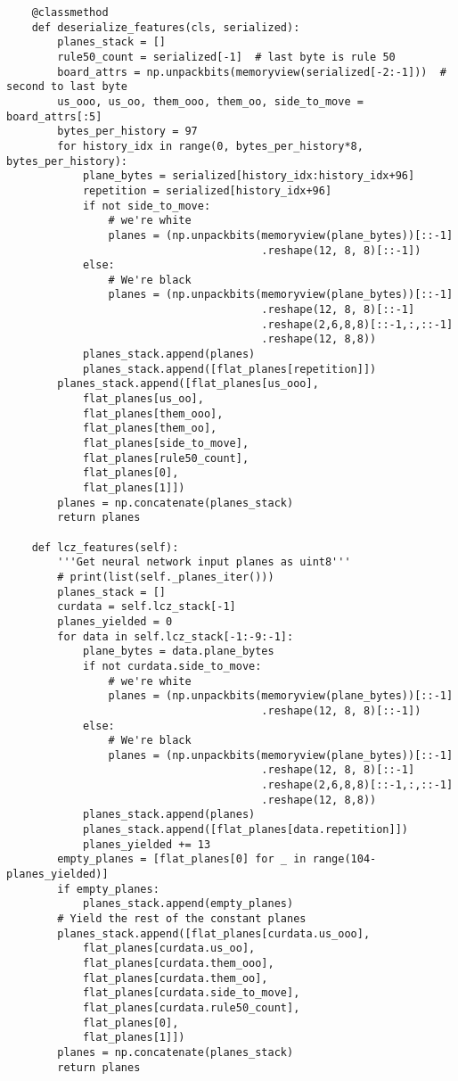 \begin{verbatim}
    @classmethod
    def deserialize_features(cls, serialized):
        planes_stack = []
        rule50_count = serialized[-1]  # last byte is rule 50
        board_attrs = np.unpackbits(memoryview(serialized[-2:-1]))  # second to last byte
        us_ooo, us_oo, them_ooo, them_oo, side_to_move = board_attrs[:5]
        bytes_per_history = 97
        for history_idx in range(0, bytes_per_history*8, bytes_per_history):
            plane_bytes = serialized[history_idx:history_idx+96]
            repetition = serialized[history_idx+96]
            if not side_to_move:
                # we're white
                planes = (np.unpackbits(memoryview(plane_bytes))[::-1]
                                        .reshape(12, 8, 8)[::-1])                
            else:
                # We're black
                planes = (np.unpackbits(memoryview(plane_bytes))[::-1]
                                        .reshape(12, 8, 8)[::-1]
                                        .reshape(2,6,8,8)[::-1,:,::-1]
                                        .reshape(12, 8,8))
            planes_stack.append(planes)
            planes_stack.append([flat_planes[repetition]])
        planes_stack.append([flat_planes[us_ooo],
            flat_planes[us_oo],
            flat_planes[them_ooo],
            flat_planes[them_oo],
            flat_planes[side_to_move],
            flat_planes[rule50_count],
            flat_planes[0],
            flat_planes[1]])     
        planes = np.concatenate(planes_stack)
        return planes                
        
    def lcz_features(self):
        '''Get neural network input planes as uint8'''
        # print(list(self._planes_iter()))
        planes_stack = []
        curdata = self.lcz_stack[-1]
        planes_yielded = 0
        for data in self.lcz_stack[-1:-9:-1]:
            plane_bytes = data.plane_bytes
            if not curdata.side_to_move:
                # we're white
                planes = (np.unpackbits(memoryview(plane_bytes))[::-1]
                                        .reshape(12, 8, 8)[::-1])                
            else:
                # We're black
                planes = (np.unpackbits(memoryview(plane_bytes))[::-1]
                                        .reshape(12, 8, 8)[::-1]
                                        .reshape(2,6,8,8)[::-1,:,::-1]
                                        .reshape(12, 8,8))
            planes_stack.append(planes)
            planes_stack.append([flat_planes[data.repetition]])
            planes_yielded += 13
        empty_planes = [flat_planes[0] for _ in range(104-planes_yielded)]
        if empty_planes:
            planes_stack.append(empty_planes)
        # Yield the rest of the constant planes
        planes_stack.append([flat_planes[curdata.us_ooo],
            flat_planes[curdata.us_oo],
            flat_planes[curdata.them_ooo],
            flat_planes[curdata.them_oo],
            flat_planes[curdata.side_to_move],
            flat_planes[curdata.rule50_count],
            flat_planes[0],
            flat_planes[1]])     
        planes = np.concatenate(planes_stack)
        return planes


\end{verbatim}
